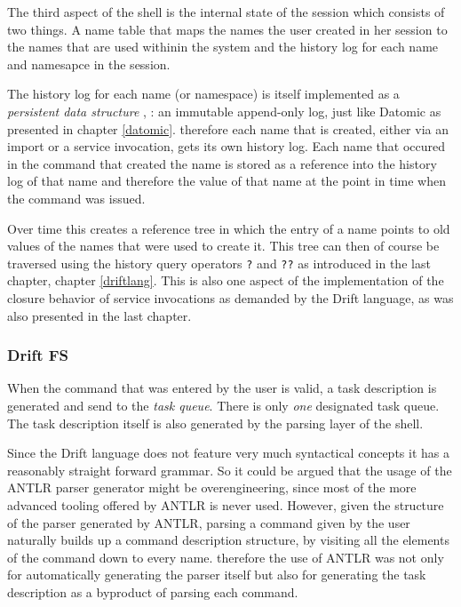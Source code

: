 The third aspect of the shell is the internal state of the session
which consists of two things. A name table that maps the names the
user created in her session to the names that are used withinin the
system and the history log for each name and namesapce in the session.

The history log for each name (or namespace) is itself implemented as a
\textit{persistent data structure} \cite{pds-paper}, \cite{pds-book}:
an immutable append-only log, just like Datomic as presented in
chapter \ref{datomic}. therefore each name that is
created, either via an import or a service invocation, gets its
own history log. Each name that occured in the command
that created the name is stored as a reference into the
history log of that name and therefore the value of that name
at the point in time when the command was issued.

Over time this creates a reference tree in which the entry of a name
points to old values of the names that were used to create it. This
tree can then of course be traversed using the history query
operators \texttt{?} and \texttt{??} as introduced in the last
chapter, chapter \ref{driftlang}. This is also one aspect of the
implementation of the closure behavior of service invocations as
demanded by the Drift language, as was also presented in the last
chapter.

\subsubsection{Drift FS}
\label{driftfs}
When the command that was entered by the user is valid, a
task description is generated and send to the \textit{task queue}.
There is only  \textit{one} designated task queue. The task description
itself is also generated by the parsing layer of the shell.

Since the Drift language does not feature very much syntactical
concepts it has a reasonably straight forward grammar. So it could
be argued that the usage of the ANTLR parser generator might be
overengineering, since most of the more advanced tooling offered
by ANTLR is never used. However, given the structure
of the parser generated by ANTLR, parsing
a command given by the user naturally builds up a command
description structure, by visiting all the elements of the
command down to every name. therefore the use of ANTLR was not only for
automatically generating the parser itself but also for generating the
task description as a byproduct of parsing each command.

